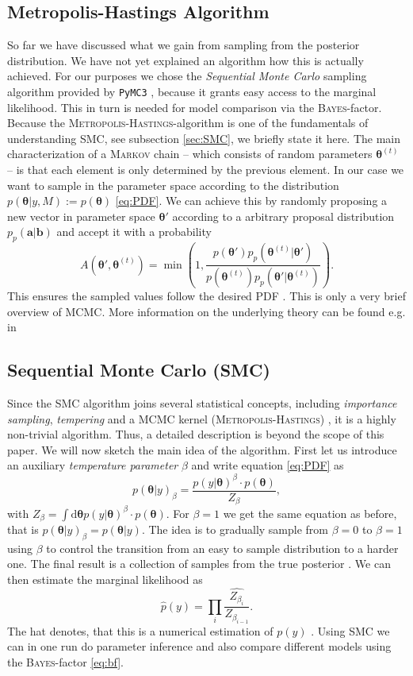 \documentclass[%
 reprint,
 amsmath,amssymb,
 aps,
]{revtex4-1}
\newcommand{\btheta}{\boldsymbol{\theta}}
\begin{document}
\subsection{Metropolis-Hastings Algorithm}
\noindent So far we have discussed what we gain from sampling from the posterior distribution. We have not yet explained an algorithm how this is actually achieved.  For our purposes we chose the \emph{Sequential Monte Carlo} sampling algorithm provided by \texttt{PyMC3} \cite{PyMC3_SMC}, because it grants easy access to the marginal likelihood. This in turn is needed for model comparison via the \textsc{Bayes}-factor. Because the \textsc{Metropolis-Hastings}-algorithm is one of the fundamentals of understanding SMC, see subsection \eqref{sec:SMC}, we briefly state it here. The main characterization of a \textsc{Markov} chain -- which consists of random parameters $\boldsymbol{\theta}^{(t)}$ -- is that each element is only determined by the previous element. In our case we want to sample in the parameter space according to the distribution $p(\btheta|y,M):=p(\btheta)$ \eqref{eq:PDF}. We can achieve this by randomly proposing a new vector in parameter space $\btheta'$  according to a arbitrary proposal distribution $p_p(\boldsymbol{a}|\boldsymbol{b})$ and accept it with a probability $$A(\btheta',\btheta^{(t)})=\min\left(1,\frac{p(\btheta')p_p(\btheta^{(t)}|\btheta')}{p(\btheta^{(t)})p_p(\btheta'|\btheta^{(t)})}\right).$$
This ensures the sampled values follow the desired PDF \cite{Toussaint}. This is only a very brief overview of MCMC. More information on the underlying theory can be found e.g. in \cite{neal}

\subsection{Sequential Monte Carlo (SMC)}\label{sec:SMC}
 \noindent Since the SMC algorithm joins several statistical concepts, including \emph{importance sampling}, \emph{tempering} and a MCMC kernel (\textsc{Metropolis-Hastings}) \cite{PyMC3_SMC}, it is a highly non-trivial algorithm. Thus, a detailed description is beyond the scope of this paper. We will now sketch the main idea of the algorithm. 
 First let us introduce an auxiliary \emph{temperature parameter} $\beta$ and write equation \eqref{eq:PDF} as 
   $$p(\btheta|y)_\beta=\frac{p(y|\btheta)^\beta\cdot p(\btheta)}{Z_\beta},$$
   with $Z_\beta=\int\text{d}\btheta p(y|\btheta)^\beta\cdot p(\btheta)$. For $\beta=1$ we get the same equation as before, that is $p(\btheta|y)_\beta=p(\btheta|y)$. The idea is to gradually sample from $\beta=0$ to $\beta=1$ using $\beta$ to control the transition from an easy to sample distribution to a harder one. The final result is a collection of samples from the true posterior \cite{PyMC3_SMC}. We can then estimate the marginal likelihood as \cite{SMC_PEPE} \begin{equation}\label{eq:with_the_hat}
   	\hat{p}(y)=\prod_{i}\widehat{\frac{Z_{\beta_i}}{Z_{\beta_{i-1}}}}.
   \end{equation}
     The hat denotes, that this is a numerical estimation of $p(y)$ \cite{SMC_PEPE}. Using SMC we can in one run do parameter inference and also compare different models using the \textsc{Bayes}-factor \eqref{eq:bf}.
 
\end{document}
